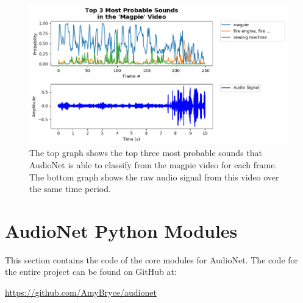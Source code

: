 \documentclass[12pt,twoside]{article}
\theoremstyle{plain}
\theoremstyle{definition}
\theoremstyle{remark}
\begin{document}
\begin{figure}[h]
   \centerline{\includegraphics[width=\textwidth]{inf_magpie.png}}
   {\caption{\footnotesize The top graph shows the top three most probable sounds that AudioNet is able to classify from the magpie video for each frame.
             The bottom graph shows the raw audio signal from this video over the same time period.}
     \label{fig:inf_magpie}}
\end{figure}


\section{AudioNet Python Modules}
\label{sec:pythonmodules}
This section contains the code of the core modules for AudioNet.
The code for the entire project can be found on GitHub at:

\noindent
\begin{center}
\url{https://github.com/AmyBryce/audionet}
\end{center}


\newpage

\newpage

\newpage


%
%
\newpage
{}%


\end{document}
